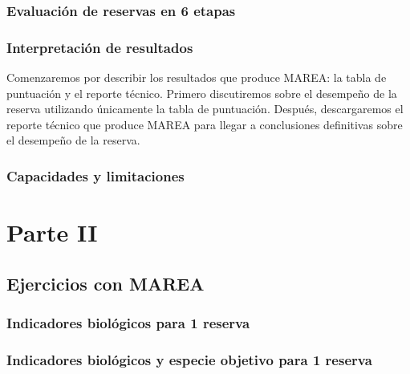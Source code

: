 \documentclass[]{krantz}
\begin{document}
\hypertarget{evaluacion-de-reservas-en-6-etapas}{%
\section{Evaluación de reservas en 6
etapas}\label{evaluacion-de-reservas-en-6-etapas}}

\hypertarget{interpretacion-de-resultados}{%
\section{Interpretación de
resultados}\label{interpretacion-de-resultados}}

Comenzaremos por describir los resultados que produce MAREA: la tabla de
puntuación y el reporte técnico. Primero discutiremos sobre el desempeño
de la reserva utilizando únicamente la tabla de puntuación. Después,
descargaremos el reporte técnico que produce MAREA para llegar a
conclusiones definitivas sobre el desempeño de la reserva.

\hypertarget{capacidades-y-limitaciones}{%
\section{Capacidades y limitaciones}\label{capacidades-y-limitaciones}}

\hypertarget{part-parte-ii}{%
\part{Parte II}\label{part-parte-ii}}

\hypertarget{ejercicios-con-marea}{%
\chapter{Ejercicios con MAREA}\label{ejercicios-con-marea}}

\hypertarget{indicadores-biologicos-para-1-reserva}{%
\section{Indicadores biológicos para 1
reserva}\label{indicadores-biologicos-para-1-reserva}}

\hypertarget{indicadores-biologicos-y-especie-objetivo-para-1-reserva}{%
\section{Indicadores biológicos y especie objetivo para 1
reserva}\label{indicadores-biologicos-y-especie-objetivo-para-1-reserva}}
\end{document}
